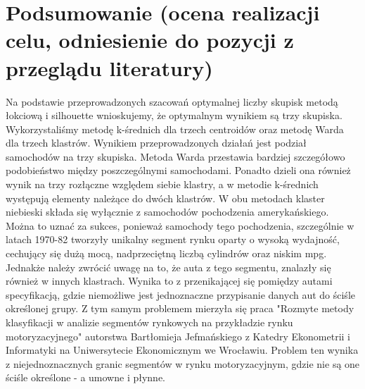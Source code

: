 \documentclass{article}
\begin{document}
\section{Podsumowanie (ocena realizacji celu, odniesienie do pozycji z przeglądu literatury)}
Na podstawie przeprowadzonych szacowań optymalnej liczby skupisk metodą łokciową i silhouette wnioskujemy, że optymalnym wynikiem są 
trzy skupiska. Wykorzystaliśmy metodę k-średnich dla trzech centroidów oraz metodę Warda dla trzech klastrów. Wynikiem przeprowadzonych 
działań jest podział samochodów na trzy skupiska. Metoda Warda przestawia bardziej szczegółowo podobieństwo między poszczególnymi 
samochodami. Ponadto dzieli ona również wynik na trzy rozłączne względem siebie klastry, a w metodie k-średnich występują elementy należące 
do dwóch klastrów. W obu metodach klaster niebieski składa się wyłącznie z samochodów pochodzenia amerykańskiego. 
Można to uznać za sukces, ponieważ samochody tego pochodzenia, szczególnie w latach 1970-82 tworzyły unikalny segment 
rynku oparty o wysoką wydajność, cechujący się dużą mocą, nadprzeciętną liczbą cylindrów oraz niskim mpg. Jednakże należy zwrócić uwagę na to, że auta z tego segmentu, znalazły się również w innych klastrach. Wynika to z przenikającej się pomiędzy autami specyfikacją, gdzie niemożliwe jest jednoznaczne przypisanie danych aut do ściśle określonej grupy. Z tym samym problemem mierzyła się praca "Rozmyte metody klasyfikacji w analizie segmentów rynkowych na przykładzie rynku motoryzacyjnego" autorstwa Bartłomieja Jefmańskiego z Katedry Ekonometrii i Informatyki na Uniwersytecie Ekonomicznym we Wrocławiu. Problem ten wynika z niejednoznacznych granic segmentów w rynku motoryzacyjnym, gdzie nie są one ściśle określone - a umowne i płynne.
\end{document}
